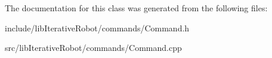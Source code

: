 The documentation for this class was generated from the following files\+:\begin{DoxyCompactItemize}
\item 
include/lib\+Iterative\+Robot/commands/Command.\+h\item 
src/lib\+Iterative\+Robot/commands/Command.\+cpp\end{DoxyCompactItemize}
